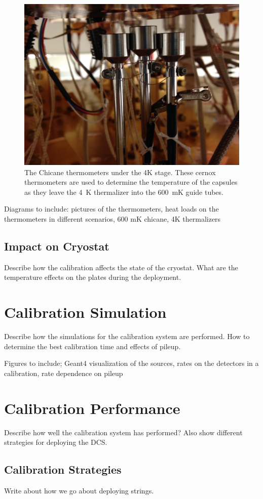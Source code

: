 \begin{figure}[htbp]
    \centering
    \includegraphics[width=0.8\linewidth]{Figures/ChicaneThermometers.JPG}
    \caption[The chicane thermometers.]
    {The Chicane thermometers under the 4K stage.
    These cernox thermometers are used to determine the temperature of the capsules as they leave the 4~K thermalizer into the 600~mK guide tubes.}
    \label{fig:chicane_thermometers}
\end{figure}

Diagrams to include: pictures of the thermometers, heat loads on the thermometers in different scenarios, 600 mK chicane, 4K thermalizers
\subsection{Impact on Cryostat}

Describe how the calibration affects the state of the cryostat. What are the temperature effects on the plates during the deployment.


\section{Calibration Simulation}
Describe how the simulations for the calibration system are performed. How to determine the best calibration time and effects of pileup.

Figures to include; Geant4 visualization of the sources, rates on the detectors in a calibration, rate dependence on pileup 

\section{Calibration Performance}

Describe how well the calibration system has performed? Also show different strategies for deploying the DCS.

\subsection{Calibration Strategies}

Write about how we go about deploying strings.